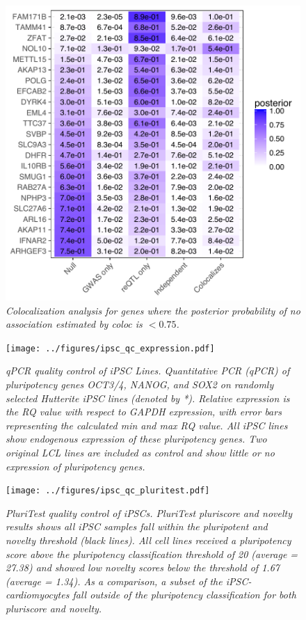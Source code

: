 \documentclass{article}
\begin{document}
\begin{figure}[h]
\begin{center}
    \includegraphics[width=.7\textwidth]{../figures/coloc.pdf} 
    \caption{\it{Colocalization analysis for genes where the posterior probability of no association estimated by \emph{coloc} is $<0.75$.}}
    \label{fig:coloc}
    \end{center}
\end{figure}

\begin{figure}[h]
\begin{center}
    \texttt{[image: ../figures/ipsc\_qc\_expression.pdf]} 
    \caption{\it{qPCR quality control of iPSC Lines. Quantitative PCR (qPCR) of pluripotency genes OCT3/4, NANOG, and SOX2 on randomly selected Hutterite iPSC lines (denoted by *). Relative expression is the RQ value with respect to GAPDH expression, with error bars representing the calculated min and max RQ value. All iPSC lines show endogenous expression of these pluripotency genes. Two original LCL lines are included as control and show little or no expression of pluripotency genes.}}
    \label{fig:ipsc_qc_expression}
    \end{center}
\end{figure}

\begin{figure}[h]
\begin{center}
    \texttt{[image: ../figures/ipsc\_qc\_pluritest.pdf]} 
    \caption{\it{PluriTest quality control of iPSCs. PluriTest pluriscore and novelty results shows all iPSC samples fall within the pluripotent and novelty threshold (black lines). All cell lines received a pluripotency score above the pluripotency classification threshold of 20 (average = 27.38) and showed low novelty scores below the threshold of 1.67 (average = 1.34). As a comparison, a subset of the iPSC-cardiomyocytes fall outside of the pluripotency classification for both pluriscore and novelty.}}
    \label{fig:ipsc_qc_pluritest}
    \end{center}
\end{figure}
\end{document}
